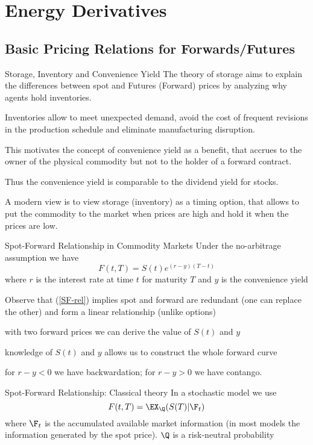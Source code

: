 \section{Energy Derivatives}
\subsection{Basic Pricing Relations for Forwards/Futures}

Storage, Inventory and Convenience Yield
	The theory of storage aims to explain the differences between spot
	and Futures (Forward) prices by analyzing why agents hold inventories.
	
	Inventories allow to meet unexpected demand, avoid the cost of frequent revisions in
	the production schedule and eliminate manufacturing disruption.
	
	This motivates the concept of convenience yield as a benefit, that accrues to the
	owner of the physical commodity but not to the holder of a forward contract.
	
	Thus the convenience yield is comparable to the dividend yield for stocks.
	
	A modern view is to view storage (inventory) as a timing option, that
	allows to put the commodity to the market when prices are high
	and hold it when the prices are low.


Spot-Forward Relationship in Commodity Markets
	Under the no-arbitrage assumption we have
	\begin{equation}\label{SF-rel}
	F(t,T)=S(t)e^{(r-y)(T-t)}
	\end{equation}
	where $r$ is the interest rate at time $t$ for maturity $T$ and $y$ is the convenience yield

	Observe that (\ref{SF-rel}) implies
		spot and forward are redundant (one can replace the other) and form a linear relationship (unlike options)
	
		with two forward prices we can derive the value of $S(t)$ and $y$
		
		knowledge of $S(t)$ and $y$ allows us to construct the whole forward curve
		
		for $r-y <0$ we have backwardation; for $r-y>0$ we have contango.


Spot-Forward Relationship: Classical theory
	In a stochastic model we use
		$$
		F(t,T)=\EX_{\Q}(S(T)|\F_t)
		$$
	where $\F_t$ is the accumulated available market information (in most models the information generated by the spot price).
	$\Q$ is a risk-neutral probability

